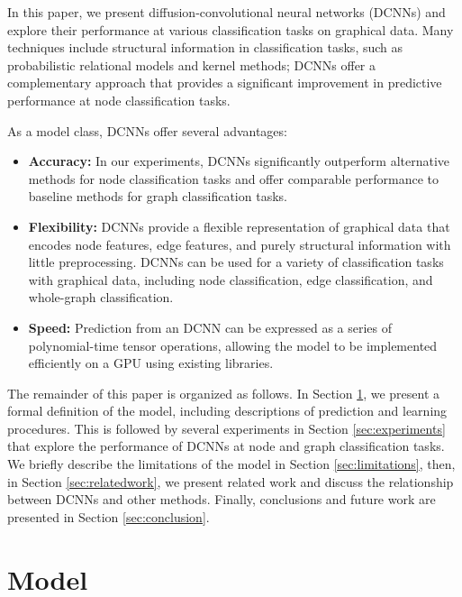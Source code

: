 \documentclass{article}
\begin{document}
In this paper, we present diffusion-convolutional neural networks (DCNNs) and explore their performance at various classification tasks on graphical data.  Many techniques include structural information in classification tasks, such as probabilistic relational models and kernel methods; DCNNs offer a complementary approach that provides a significant improvement in predictive performance at node classification tasks.

As a model class, DCNNs offer several advantages:
\begin{itemize}
    \item \textbf{Accuracy:} In our experiments, DCNNs significantly outperform alternative methods for node classification tasks and offer comparable performance to baseline methods for graph classification tasks.
    
    \item \textbf{Flexibility:}  DCNNs provide a flexible representation of graphical data that encodes node features, edge features, and purely structural information with little preprocessing.  DCNNs can be used for a variety of classification tasks with graphical data, including node classification, edge classification, and whole-graph classification.
    
    \item \textbf{Speed:} Prediction from an DCNN can be expressed as a series of polynomial-time tensor operations, allowing the model to be implemented efficiently on a GPU using existing libraries.
\end{itemize}

The remainder of this paper is organized as follows.  In Section \ref{sec:model}, we present a formal definition of the model, including descriptions of prediction and learning procedures.  This is followed by several experiments in Section \ref{sec:experiments} that explore the performance of DCNNs at node and graph classification tasks.  We briefly describe the limitations of the model in Section \ref{sec:limitations}, then, in Section \ref{sec:relatedwork}, we present related work and discuss the relationship between DCNNs and other methods.  Finally, conclusions and future work are presented in Section \ref{sec:conclusion}.

\section{Model}
\label{sec:model}
\end{document}
